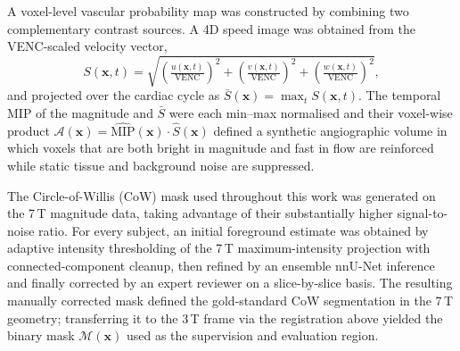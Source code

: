 \documentclass[11pt]{article}
\begin{document}
A voxel-level vascular probability map was constructed by combining
two complementary contrast sources. A 4D speed image was obtained from
the VENC-scaled velocity vector,
\begin{equation}
    S(\mathbf{x}, t) = \sqrt{
        \left(\tfrac{u(\mathbf{x},t)}{\mathrm{VENC}}\right)^2 +
        \left(\tfrac{v(\mathbf{x},t)}{\mathrm{VENC}}\right)^2 +
        \left(\tfrac{w(\mathbf{x},t)}{\mathrm{VENC}}\right)^2},
\end{equation}
and projected over the cardiac cycle as
$\bar{S}(\mathbf{x}) = \max_t S(\mathbf{x},t)$. The temporal MIP of the
magnitude and $\bar{S}$ were each min--max normalised and their
voxel-wise product
$\mathcal{A}(\mathbf{x}) = \hat{\mathrm{MIP}}(\mathbf{x}) \cdot
\hat{S}(\mathbf{x})$ defined a synthetic angiographic volume in which
voxels that are both bright in magnitude and fast in flow are reinforced
while static tissue and background noise are suppressed.

The Circle-of-Willis (CoW) mask used throughout this work was generated
on the 7\,T magnitude data, taking advantage of their substantially
higher signal-to-noise ratio. For every subject, an initial foreground
estimate was obtained by adaptive intensity thresholding of the 7\,T
maximum-intensity projection with connected-component cleanup, then
refined by an ensemble nnU-Net inference and finally corrected by an
expert reviewer on a slice-by-slice basis. The resulting manually
corrected mask defined the gold-standard CoW segmentation in the 7\,T
geometry; transferring it to the 3\,T frame via the registration above
yielded the binary mask $\mathcal{M}(\mathbf{x})$ used as the
supervision and evaluation region.
\end{document}
